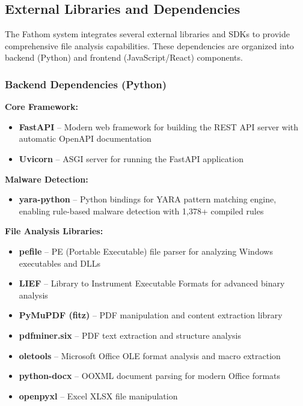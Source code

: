 \subsection{External Libraries and Dependencies}

The Fathom system integrates several external libraries and SDKs to provide comprehensive file analysis capabilities. These dependencies are organized into backend (Python) and frontend (JavaScript/React) components.

\subsubsection{Backend Dependencies (Python)}

\textbf{Core Framework:}
\begin{itemize}
    \item \textbf{FastAPI} -- Modern web framework for building the REST API server with automatic OpenAPI documentation
    \item \textbf{Uvicorn} -- ASGI server for running the FastAPI application
\end{itemize}

\textbf{Malware Detection:}
\begin{itemize}
    \item \textbf{yara-python} -- Python bindings for YARA pattern matching engine, enabling rule-based malware detection with 1,378+ compiled rules
\end{itemize}

\textbf{File Analysis Libraries:}
\begin{itemize}
    \item \textbf{pefile} -- PE (Portable Executable) file parser for analyzing Windows executables and DLLs
    \item \textbf{LIEF} -- Library to Instrument Executable Formats for advanced binary analysis
    \item \textbf{PyMuPDF (fitz)} -- PDF manipulation and content extraction library
    \item \textbf{pdfminer.six} -- PDF text extraction and structure analysis
    \item \textbf{oletools} -- Microsoft Office OLE format analysis and macro extraction
    \item \textbf{python-docx} -- OOXML document parsing for modern Office formats
    \item \textbf{openpyxl} -- Excel XLSX file manipulation
\end{itemize}

